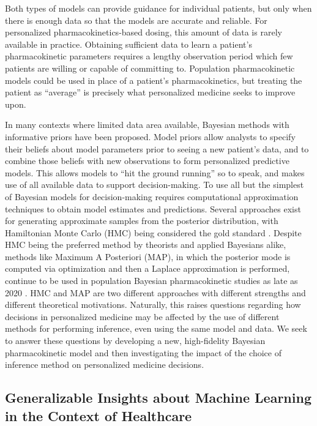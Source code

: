 Both types of  models can provide guidance for individual patients, but only when there is enough data so that the models are accurate and reliable. For personalized pharmacokinetics-based dosing, this amount of data is rarely available in practice.  Obtaining sufficient data to learn a patient’s pharmacokinetic parameters requires a lengthy observation period which few patients are willing or capable of committing to. Population pharmacokinetic models could be used in place of a patient’s pharmacokinetics, but treating the patient as “average” is precisely what personalized medicine seeks to improve upon.

In many contexts where limited data area available, Bayesian methods with informative priors have been proposed.  Model priors allow analysts to specify their beliefs about model parameters prior to seeing a new patient's data, and to combine those beliefs with new observations to form personalized predictive models.  This allows models to ``hit the ground running'' so to speak, and makes use of all available data to support decision-making.  To use all but the simplest of Bayesian models for decision-making requires computational approximation techniques to obtain model estimates and predictions. Several approaches exist for generating approximate samples from the posterior distribution, with Hamiltonian Monte Carlo (HMC) being considered the gold standard \cite{Neal1996-vn, Matthew_D_Hoffman2014-in, Carpenter2017-qf, Tripuraneni2017-oh}. Despite HMC being the preferred method by theorists and applied Bayesians alike, methods like Maximum A Posteriori (MAP), in which the posterior mode is computed via optimization and then a Laplace approximation is performed, continue to be used in population Bayesian pharmacokinetic studies as late as 2020 \cite{Brooks2016-li, Nguyen2016-pg,  Preijers2019-kc,Stifft2020-uq}. HMC and MAP are two different approaches with different strengths and different theoretical motivations. Naturally, this raises questions regarding how decisions in personalized medicine may be affected by the use of different methods for performing inference, even using the same model and data. We seek to answer these questions by developing a new, high-fidelity Bayesian pharmacokinetic model and then investigating the impact of the choice of inference method on personalized medicine decisions. 

\subsection*{Generalizable Insights about Machine Learning in the Context of Healthcare}

